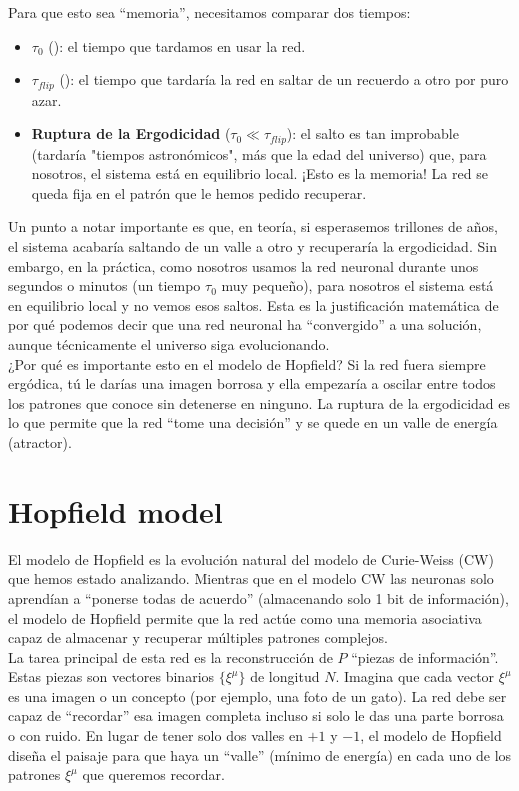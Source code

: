 \noindent
Para que esto sea ``memoria'', necesitamos comparar dos tiempos:
\begin{itemize}
    \item $\tau_0$ (): el tiempo que tardamos en usar la red.
    \item $\tau_{flip}$ (): el tiempo que tardaría la red en saltar de un recuerdo a otro por puro azar.
    \item \textbf{Ruptura de la Ergodicidad} ($\tau_0 \ll \tau_{flip}$): el salto es tan improbable (tardaría "tiempos astronómicos", más que la edad del universo) que, para nosotros, el sistema está en equilibrio local. ¡Esto es la memoria! La red se queda fija en el patrón que le hemos pedido recuperar.
\end{itemize}
Un punto a notar importante es que, en teoría, si esperasemos trillones de años, el sistema acabaría saltando de un valle a otro y recuperaría la ergodicidad. Sin embargo, en la práctica, como nosotros usamos la red neuronal durante unos segundos o minutos (un tiempo $\tau_0$ muy pequeño), para nosotros el sistema está en equilibrio local y no vemos esos saltos. Esta es la justificación matemática de por qué podemos decir que una red neuronal ha ``convergido'' a una solución, aunque técnicamente el universo siga evolucionando. \\

\noindent
¿Por qué es importante esto en el modelo de Hopfield? Si la red fuera siempre ergódica, tú le darías una imagen borrosa y ella empezaría a oscilar entre todos los patrones que conoce sin detenerse en ninguno. La ruptura de la ergodicidad es lo que permite que la red ``tome una decisión'' y se quede en un valle de energía (atractor).

\section{Hopfield model}
\noindent
El modelo de Hopfield es la evolución natural del modelo de Curie-Weiss (CW) que hemos estado analizando. Mientras que en el modelo CW las neuronas solo aprendían a ``ponerse todas de acuerdo'' (almacenando solo 1 bit de información), el modelo de Hopfield permite que la red actúe como una memoria asociativa capaz de almacenar y recuperar múltiples patrones complejos. \\


\noindent
La tarea principal de esta red es la reconstrucción de $P$ ``piezas de información''. Estas piezas son vectores binarios $\{\xi^\mu\}$ de longitud $N$. Imagina que cada vector $\xi^\mu$ es una imagen o un concepto (por ejemplo, una foto de un gato). La red debe ser capaz de ``recordar'' esa imagen completa incluso si solo le das una parte borrosa o con ruido. En lugar de tener solo dos valles en $+1$ y $-1$, el modelo de Hopfield diseña el paisaje para que haya un ``valle'' (mínimo de energía) en cada uno de los patrones $\xi^\mu$ que queremos recordar. \\

